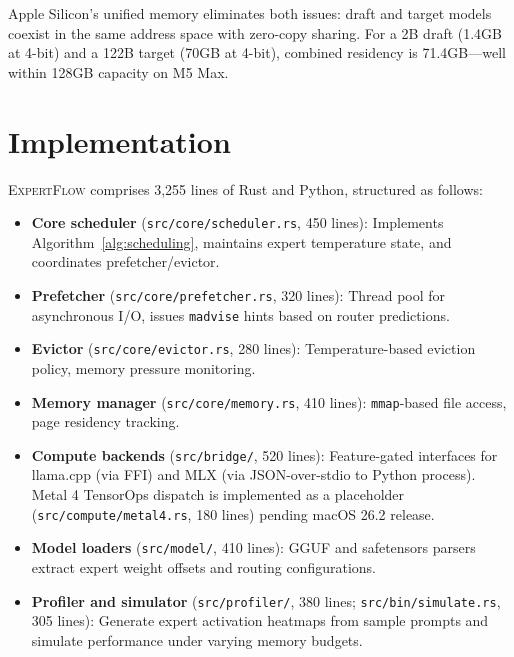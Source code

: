 \documentclass[11pt]{article}
\begin{document}
Apple Silicon's unified memory eliminates both issues: draft and target models coexist in the same address space with zero-copy sharing. For a 2B draft (1.4GB at 4-bit) and a 122B target (70GB at 4-bit), combined residency is 71.4GB—well within 128GB capacity on M5 Max.

\section{Implementation}
\label{sec:implementation}

\textsc{ExpertFlow} comprises 3,255 lines of Rust and Python, structured as follows:

\begin{itemize}
    \item \textbf{Core scheduler} (\texttt{src/core/scheduler.rs}, 450 lines): Implements Algorithm~\ref{alg:scheduling}, maintains expert temperature state, and coordinates prefetcher/evictor.

    \item \textbf{Prefetcher} (\texttt{src/core/prefetcher.rs}, 320 lines): Thread pool for asynchronous I/O, issues \texttt{madvise} hints based on router predictions.

    \item \textbf{Evictor} (\texttt{src/core/evictor.rs}, 280 lines): Temperature-based eviction policy, memory pressure monitoring.

    \item \textbf{Memory manager} (\texttt{src/core/memory.rs}, 410 lines): \texttt{mmap}-based file access, page residency tracking.

    \item \textbf{Compute backends} (\texttt{src/bridge/}, 520 lines): Feature-gated interfaces for llama.cpp (via FFI) and MLX (via JSON-over-stdio to Python process). Metal 4 TensorOps dispatch is implemented as a placeholder (\texttt{src/compute/metal4.rs}, 180 lines) pending macOS 26.2 release.

    \item \textbf{Model loaders} (\texttt{src/model/}, 410 lines): GGUF and safetensors parsers extract expert weight offsets and routing configurations.

    \item \textbf{Profiler and simulator} (\texttt{src/profiler/}, 380 lines; \texttt{src/bin/simulate.rs}, 305 lines): Generate expert activation heatmaps from sample prompts and simulate performance under varying memory budgets.
\end{itemize}
\end{document}
